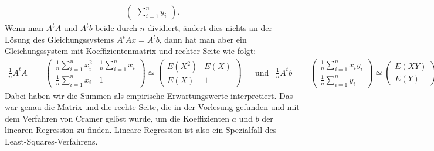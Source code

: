 \begin{loesung}
\[\begin{aligned}
\begin{pmatrix}
\displaystyle \sum_{i=1}^n y_i
\end{pmatrix}.
\end{aligned}
\]
Wenn man $A^tA$ und $A^tb$ beide durch $n$ dividiert, ändert dies nichts an
der Lösung des Gleichungssystems $A^tAx=A^tb$, dann hat man aber ein
Gleichungssystem mit Koeffizientenmatrix und rechter Seite wie folgt:
\begin{align*}
\frac1nA^tA&=\begin{pmatrix}
\displaystyle \frac1n\sum_{i=1}^nx_i^2& \displaystyle \frac1n\sum_{i=1}^nx_i\\
\displaystyle \frac1n\sum_{i=1}^nx_i  & 1
\end{pmatrix}
\simeq
\begin{pmatrix}
E(X^2)&E(X)\\E(X)&1
\end{pmatrix}
&&\text{und}
&
\frac1nA^tb&=\begin{pmatrix}
\displaystyle \frac1n\sum_{i=1}^n x_iy_i\\
\displaystyle \frac1n\sum_{i=1}^n y_i
\end{pmatrix}
\simeq
\begin{pmatrix}
E(XY)\\E(Y)
\end{pmatrix}
\end{align*}
Dabei haben wir die Summen als empirische Erwartungswerte interpretiert.
Das war genau die Matrix und die rechte Seite, die in der Vorlesung gefunden
und mit dem Verfahren von Cramer gelöst wurde, um die Koeffizienten $a$ und $b$
der linearen Regression zu finden.
Lineare Regression ist also ein Spezialfall des Least-Squares-Verfahrens.
\end{loesung}
